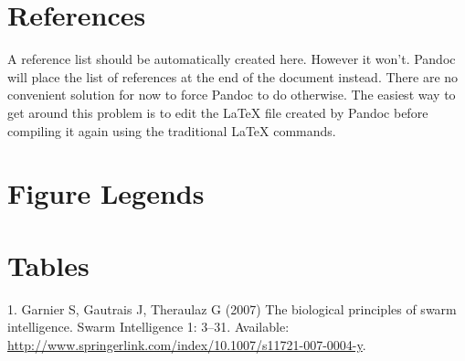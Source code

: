 \documentclass[10pt]{article}
\begin{document}
\section*{References}\label{references}

A reference list should be automatically created here. However it won't.
Pandoc will place the list of references at the end of the document
instead. There are no convenient solution for now to force Pandoc to do
otherwise. The easiest way to get around this problem is to edit the
LaTeX file created by Pandoc before compiling it again using the
traditional LaTeX commands.

\section*{Figure Legends}\label{figure-legends}

\section*{Tables}\label{tables}

1. Garnier S, Gautrais J, Theraulaz G (2007) The biological principles
of swarm intelligence. Swarm Intelligence 1: 3--31. Available:
\url{http://www.springerlink.com/index/10.1007/s11721-007-0004-y}.
\end{document}

